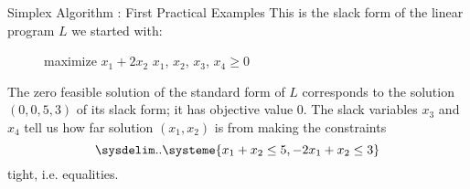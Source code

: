 \documentclass[aspectratio = 169]{beamer}
\begin{document}
\begin{frame}{Simplex Algorithm : First Practical Examples}
    This is the slack form of the linear program $L$ we started with:
    \begin{figure}
      \begin{linearProg}{
          maximize
        }{
          $x_1 + 2x_2$
        }{
        }{
          $x_1$, $x_2$, $x_3$, $x_4 \geq 0$
        }
      \end{linearProg}
    \end{figure}
    The zero feasible solution of the standard form of $L$ corresponds
    to the solution $(0, 0, 5, 3)$ of its slack form; it has objective
    value $0$. The slack variables $x_3$ and $x_4$ tell us how far
    solution $(x_1, x_2)$ is from making the constraints
    \[
    \sysdelim..{\systeme{x_1 + x_2 \leq 5, -2x_1 + x_2 \leq 3}}
    \]
    tight, i.e. equalities.
\end{frame}
\end{document}
